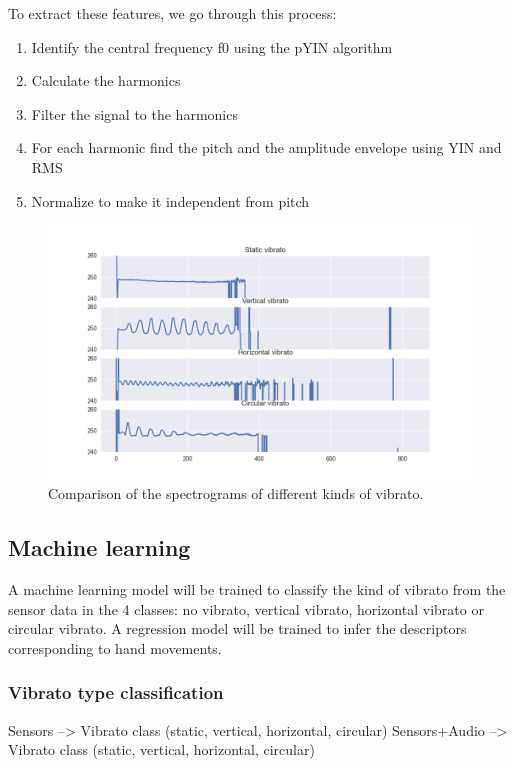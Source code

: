\documentclass{nime-alternate} %
\begin{document}
To extract these features, we go through this process:
\begin{enumerate}
    \item Identify the central frequency f0 using the pYIN algorithm \cite{}
    \item Calculate the harmonics 
    \item Filter the signal to the harmonics
    \item For each harmonic find the pitch and the amplitude envelope using YIN \cite{} and RMS \cite{}
    \item Normalize to make it independent from pitch
\end{enumerate}


\begin{figure}[htbp]
	\centering
		\includegraphics[width=1\columnwidth]{imgs/vibrato-comparison.png}
	\caption{Comparison of the spectrograms of different kinds of vibrato.}
	\label{fig:vibrato-spectrograms}
\end{figure}


\subsection{Machine learning}
A machine learning model will be trained to classify the kind of vibrato from the sensor data in the 4 classes: no vibrato, vertical vibrato, horizontal vibrato or circular vibrato. A regression model will be trained to infer the descriptors corresponding to hand movements.

\subsubsection{Vibrato type classification}

Sensors --> Vibrato class (static, vertical, horizontal, circular)
Sensors+Audio --> Vibrato class (static, vertical, horizontal, circular)
\end{document}
